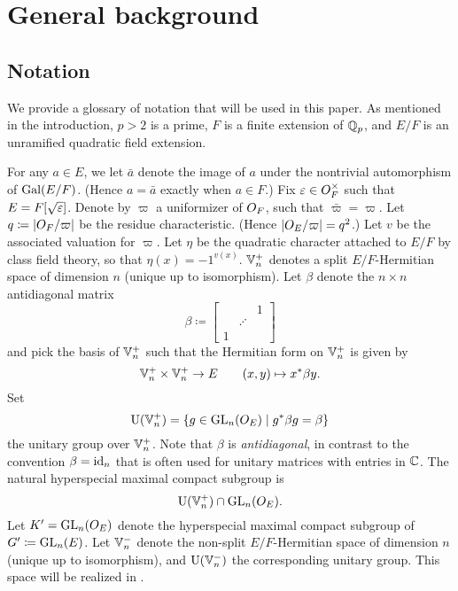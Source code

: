 \chapter{General background}
\label{ch:background}

\section{Notation}
We provide a glossary of notation that will be used in this paper.
As mentioned in the introduction, $p > 2$ is a prime,
$F$ is a finite extension of $\mathbb Q_p$,
and $E/F$ is an unramified quadratic field extension.

\begin{itemize}
  \ii For any $a \in E$, we let $\bar a$ denote the image of $a$
  under the nontrivial automorphism of $\operatorname{Gal}(E/F)$.
  (Hence $a = \bar a$ exactly when $a \in F$.)
  \ii Fix $\varepsilon \in O_F^\times$ such that $E = F[\sqrt{\varepsilon}]$.
  \ii Denote by $\varpi$ a uniformizer of $O_F$, such that $\bar \varpi = \varpi$.
  \ii Let $q \coloneqq |O_F/\varpi|$ be the residue characteristic.
  (Hence $|O_E / \varpi| = q^2$.)
  \ii Let $v$ be the associated valuation for $\varpi$.
  \ii Let $\eta$ be the quadratic character attached to $E/F$ by class field theory,
  so that $\eta(x) = -1^{v(x)}$.
  \ii $\mathbb V_n^+$ denotes a split $E/F$-Hermitian space of dimension $n$ (unique up to isomorphism).
  \ii Let $\beta$ denote the $n \times n$ antidiagonal matrix
  \[ \beta \coloneqq \begin{bmatrix} && 1 \\ & \iddots \\ 1 \end{bmatrix} \]
  and pick the basis of $\mathbb V_n^+$ such that the Hermitian form on $\mathbb V_n^+$ is given by
  \[ \mathbb V_n^+ \times \mathbb V_n^+ \to E \qquad (x,y) \mapsto x^\ast \beta y. \]
  \ii Set
  \[ \operatorname{U}(\mathbb V_n^+) = \{ g \in \operatorname{GL}_n(O_E) \mid g^\ast \beta g = \beta\} \]
  the unitary group over $\mathbb V_n^+$.
  Note that $\beta$ is \emph{antidiagonal}, in contrast to the convention $\beta = \operatorname{id}_n$
  that is often used for unitary matrices with entries in $\mathbb C$.
  The natural hyperspecial maximal compact subgroup
  is \[ \operatorname{U}(\mathbb V_n^+) \cap \operatorname{GL}_n(O_E). \]
  \ii Let $K' = \operatorname{GL}_n(O_E)$ denote the hyperspecial maximal compact subgroup of $G' \coloneqq \operatorname{GL}_n(E)$.
  \ii Let $\mathbb V_n^-$ denote the non-split $E/F$-Hermitian space of dimension $n$
  (unique up to isomorphism), and $\operatorname{U}(\mathbb V_n^-)$ the corresponding unitary group.
  This space will be realized in .
\end{itemize}

